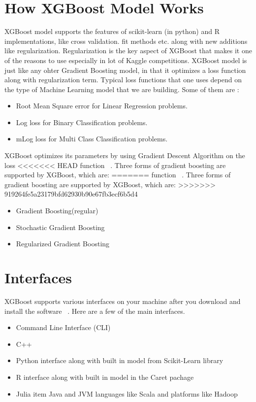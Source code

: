 \section{How XGBoost Model Works}

XGBoost model supports the features of scikit-learn (in python) and R
implementations, like cross validation. fit methods etc. along with new
additions like regularization.  Regularization is the key aspect of XGBoost that
makes it one of the reasons to use especially in  lot of Kaggle competitions.
XGBoost model is just like any ohter Gradient Boosting model, in that it
optimizes a loss function  along with regularization term. Typical loss
functions that one uses depend on the type of Machine Learning model that we are
building. Some of them are :

\begin{itemize}
\item Root Mean Square error for Linear Regression problems. 
\item Log loss for Binary Classification problems. 
\item mLog loss for Multi Class Classification problems.
\end{itemize}

XGBoost optimizes its parameters by using Gradient Descent Algorithm on the loss
<<<<<<< HEAD
function ~\cite{hid-sp18-401-XGBoost-MLmastery}. Three forms of gradient
boosting  are supported by XGBoost, which are:
=======
function ~\cite{hid-sp18-401-XGBoost-MLmastery}. Three forms of gradient boosting 
are supported by XGBoost, which are:
>>>>>>> 919264fe5a23179bfd62930b90e67fb3ecf6b5d4

\begin{itemize}
\item Gradient Boosting(regular)
\item Stochastic Gradient Boosting
\item Regularized Gradient Boosting 
\end{itemize}



\section{Interfaces}

XGBoost supports various interfaces on your machine after you download and
install the software ~\cite{hid-sp18-401-XGBoost-MLmastery}. Here are a few 
of the main interfaces.

\begin{itemize}
\item Command Line Interface (CLI)  
\item C++  
\item Python interface along with built in model from Scikit-Learn library   
\item R interface along with built in model in the Caret pachage  
\item Julia item Java and JVM languages like Scala and platforms like Hadoop
\end{itemize}



